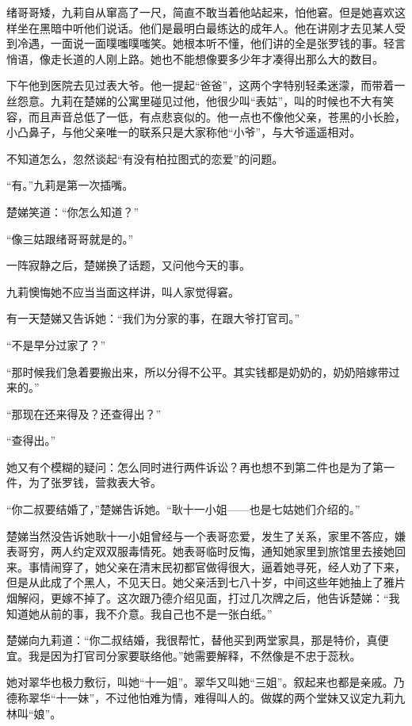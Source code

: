\par 绪哥哥矮，九莉自从窜高了一尺，简直不敢当着他站起来，怕他窘。但是她喜欢这样坐在黑暗中听他们说话。他们是最明白最练达的成年人。他在讲刚才去见某人受到冷遇，一面说一面噗嗤噗嗤笑。她根本听不懂，他们讲的全是张罗钱的事。轻言悄语，像走长道的人刚上路。她也不能想像要多少年才凑得出那么大的数目。
\par 下午他到医院去见过表大爷。他一提起“爸爸”，这两个字特别轻柔迷濛，而带着一丝怨意。九莉在楚娣的公寓里碰见过他，他很少叫“表姑”，叫的时候也不大有笑容，而且声音总低了一低，有点悲哀似的。他一点也不像他父亲，苍黑的小长脸，小凸鼻子，与他父亲唯一的联系只是大家称他“小爷”，与大爷遥遥相对。
\par 不知道怎么，忽然谈起“有没有柏拉图式的恋爱”的问题。
\par “有。”九莉是第一次插嘴。
\par 楚娣笑道：“你怎么知道？”
\par “像三姑跟绪哥哥就是的。”
\par 一阵寂静之后，楚娣换了话题，又问他今天的事。
\par 九莉懊悔她不应当当面这样讲，叫人家觉得窘。
\par 有一天楚娣又告诉她：“我们为分家的事，在跟大爷打官司。”
\par “不是早分过家了？”
\par “那时候我们急着要搬出来，所以分得不公平。其实钱都是奶奶的，奶奶陪嫁带过来的。”
\par “那现在还来得及？还查得出？”
\par “查得出。”
\par 她又有个模糊的疑问：怎么同时进行两件诉讼？再也想不到第二件也是为了第一件，为了张罗钱，营救表大爷。
\par “你二叔要结婚了，”楚娣告诉她。“耿十一小姐——也是七姑她们介绍的。”
\par 楚娣当然没告诉她耿十一小姐曾经与一个表哥恋爱，发生了关系，家里不答应，嫌表哥穷，两人约定双双服毒情死。她表哥临时反悔，通知她家里到旅馆里去接她回来。事情闹穿了，她父亲在清末民初都官做得很大，逼着她寻死，经人劝了下来，但是从此成了个黑人，不见天日。她父亲活到七八十岁，中间这些年她抽上了雅片烟解闷，更嫁不掉了。这次跟乃德介绍见面，打过几次牌之后，他告诉楚娣：“我知道她从前的事，我不介意。我自己也不是一张白纸。”
\par 楚娣向九莉道：“你二叔结婚，我很帮忙，替他买到两堂家具，那是特价，真便宜。我是因为打官司分家要联络他。”她需要解释，不然像是不忠于蕊秋。
\par 她对翠华也极力敷衍，叫她“十一姐”。翠华又叫她“三姐”。叙起来也都是亲戚。乃德称翠华“十一妹”，不过他怕难为情，难得叫人的。做媒的两个堂妹又议定九莉九林叫“娘”。
